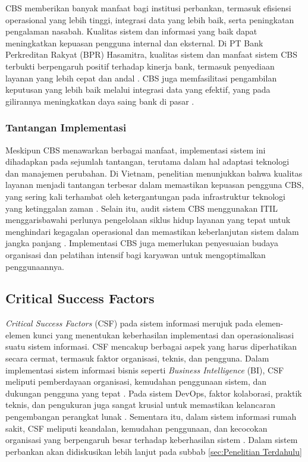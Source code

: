 \documentclass[journal,article,submit,pdftex,moreauthors]{Definitions/mdpi}
\begin{document}
CBS memberikan banyak manfaat bagi institusi perbankan, termasuk efisiensi operasional yang lebih tinggi, integrasi data yang lebih baik, serta peningkatan pengalaman nasabah. Kualitas sistem dan informasi yang baik dapat meningkatkan kepuasan pengguna internal dan eksternal. Di PT Bank Perkreditan Rakyat (BPR) Hasamitra, kualitas sistem dan manfaat sistem CBS terbukti berpengaruh positif terhadap kinerja bank, termasuk penyediaan layanan yang lebih cepat dan andal \cite{basyir-cbs}. CBS juga memfasilitasi pengambilan keputusan yang lebih baik melalui integrasi data yang efektif, yang pada gilirannya meningkatkan daya saing bank di pasar \cite{pratama-cbs}.

\subsubsection{Tantangan Implementasi}

Meskipun CBS menawarkan berbagai manfaat, implementasi sistem ini dihadapkan pada sejumlah tantangan, terutama dalam hal adaptasi teknologi dan manajemen perubahan. Di Vietnam, penelitian menunjukkan bahwa kualitas layanan menjadi tantangan terbesar dalam memastikan kepuasan pengguna CBS, yang sering kali terhambat oleh ketergantungan pada infrastruktur teknologi yang ketinggalan zaman \cite{Hsiao-ebanking}. Selain itu, audit sistem CBS menggunakan ITIL menggarisbawahi perlunya pengelolaan siklus hidup layanan yang tepat untuk menghindari kegagalan operasional dan memastikan keberlanjutan sistem dalam jangka panjang \cite{wahyudi-cbs}. Implementasi CBS juga memerlukan penyesuaian budaya organisasi dan pelatihan intensif bagi karyawan untuk mengoptimalkan penggunaannya.

\subsection{Critical Success Factors}
    \textit{Critical Success Factors} (CSF) pada sistem informasi merujuk pada elemen-elemen kunci yang menentukan keberhasilan implementasi dan operasionalisasi suatu sistem informasi. CSF mencakup berbagai aspek yang harus diperhatikan secara cermat, termasuk faktor organisasi, teknis, dan pengguna. Dalam implementasi sistem informasi bisnis seperti \textit{Business Intelligence} (BI), CSF meliputi pemberdayaan organisasi, kemudahan penggunaan sistem, dan dukungan pengguna yang tepat \cite{harfoush2024critical}. Pada sistem DevOps, faktor kolaborasi, praktik teknis, dan pengukuran juga sangat krusial untuk memastikan kelancaran pengembangan perangkat lunak \cite{jayakody2023devops}. Sementara itu, dalam sistem informasi rumah sakit, CSF meliputi keandalan, kemudahan penggunaan, dan kecocokan organisasi yang berpengaruh besar terhadap keberhasilan sistem \cite{arpaci2023hospital}. Dalam sistem perbankan akan didiskusikan lebih lanjut pada subbab \ref{sec:Penelitian Terdahulu} 
\end{document}
